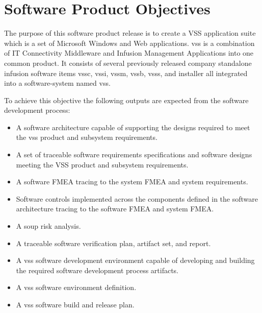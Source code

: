\section{Software Product Objectives}
The purpose of this software product release is to create a VSS application
suite which is a set of Microsoft Windows and Web applications. \gls{vss} is a
combination of IT Connectivity Middleware and Infusion Management Applications
into one common product. It consists of several previously released
\gls{company} standalone infusion software items \gls{vssc}, \gls{vssi},
\gls{vssm}, \gls{vssb}, \gls{vsss}, and \gls{installer} all integrated into a
\gls{software-system} named \gls{vss}.

\tlcVspace

To achieve this objective the following outputs are expected from the software
development process:
\begin{itemize}
  \item A software architecture capable of supporting the designs required to
    meet the \gls{vss} product and subsystem requirements.
  \item A set of traceable software requirements specifications and software
    designs meeting the VSS product and subsystem requirements.
  \item A software FMEA tracing to the system FMEA and system requirements.
  \item Software controls implemented across the components defined in the
    software architecture tracing to the software FMEA and system FMEA.
  \item A \gls{soup} risk analysis.
  \item A traceable software verification plan, artifact set, and report.
  \item A \gls{vss} software development environment capable of developing and
    building the required software development process artifacts.
  \item A \gls{vss} software environment definition.
  \item A \gls{vss} software \gls{build} and release plan.
\end{itemize}

